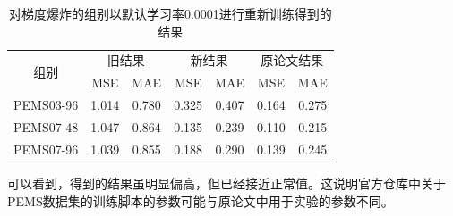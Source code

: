 \documentclass[twoside,12pt]{article}
\begin{document}
\begin{table}[htbp]
  \caption{对梯度爆炸的组别以默认学习率0.0001进行重新训练得到的结果}
  \label{tab:result_fix}
  \vspace{5pt}
  \centering
  \begin{tabular}{c|cc|cc|cc}
    \toprule
    \multirow{2}{*}{组别} & \multicolumn{2}{c|}{旧结果} & \multicolumn{2}{c|}{新结果} & \multicolumn{2}{c}{原论文结果}                         \\
    \cmidrule(lr){2-3} \cmidrule(lr){4-5} \cmidrule(lr){6-7}
                          & MSE                         & MAE                         & MSE                            & MAE   & MSE   & MAE   \\
    \midrule
    PEMS03-96             & 1.014                       & 0.780                       & 0.325                          & 0.407 & 0.164 & 0.275 \\
    PEMS07-48             & 1.047                       & 0.864                       & 0.135                          & 0.239 & 0.110 & 0.215 \\
    PEMS07-96             & 1.039                       & 0.855                       & 0.188                          & 0.290 & 0.139 & 0.245 \\
    \bottomrule
  \end{tabular}
\end{table}

可以看到，得到的结果虽明显偏高，但已经接近正常值。这说明官方仓库中关于PEMS数据集的训练脚本的参数可能与原论文中用于实验的参数不同。
\end{document}
